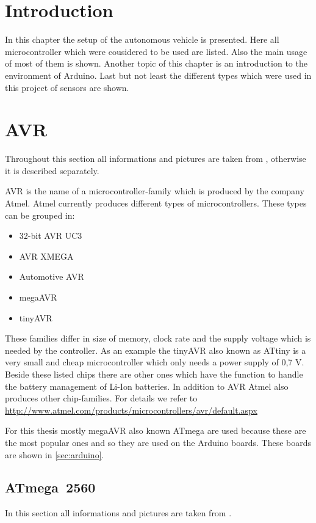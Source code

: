 \section{Introduction} \label{sec:environmentIntroduction}
In this chapter the setup of the autonomous vehicle is presented. 
Here all microcontroller which were cousidered to be used are listed.
Also the main usage of most of them is shown.
Another topic of this chapter is an introduction to the environment of Arduino.
Last but not least the different types which were used in this project of sensors are shown.


\section{AVR} \label{sec:AVR}
Throughout this section all informations and pictures are taken from \cite{web:Atmel}, otherwise it is described separately.

AVR is the name of a microcontroller-family which is produced by the company Atmel.
Atmel currently produces different types of microcontrollers.
These types can be grouped in:

\begin{itemize}
\item 32-bit AVR UC3
\item AVR XMEGA
\item Automotive AVR
\item megaAVR
\item tinyAVR
\end{itemize}

These families differ in size of memory, clock rate and the supply voltage which is needed by the controller.
As an example the tinyAVR also known as ATtiny is a very small and cheap microcontroller which only needs a power supply of 0,7 V.
Beside these listed chips there are other ones which have the function to handle the battery management of Li-Ion batteries.
In addition to AVR Atmel also produces other chip-families.
For details we refer to \url{ http://www.atmel.com/products/microcontrollers/avr/default.aspx }

For this thesis mostly megaAVR also known ATmega are used because these are the most popular ones and so they are used on the Arduino boards.
These boards are shown in \ref{sec:arduino}.


\subsection{ATmega~2560} \label{sec:atmega2560}
In this section all informations and pictures are taken from \cite{manual:atmega2560}.

